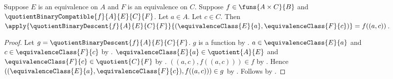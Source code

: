 \begin{proposition}\label{quotient_binary_descent_apply}
    Suppose $E$ is an equivalence on $A$ and
        $F$ is an equivalence on $C$.
    Suppose $f\in\funs{A\times C}{B}$ and
        $\quotientBinaryCompatible{f}{A}{E}{C}{F}$.
    Let $a\in A$.
    Let $c\in C$.
    Then
        $\apply{\quotientBinaryDescent{f}{A}{E}{C}{F}}
            {(\equivalenceClass{E}{a},\equivalenceClass{F}{c})}
        =f((a,c))$.
\end{proposition}
\begin{proof}
    Let $g=\quotientBinaryDescent{f}{A}{E}{C}{F}$.
    $g$ is a function by
        .
    $a\in\equivalenceClass{E}{a}$ and
        $c\in\equivalenceClass{F}{c}$ by
        .
    $\equivalenceClass{E}{a}\in\quotient{A}{E}$ and
        $\equivalenceClass{F}{c}\in\quotient{C}{F}$ by
        .
    $((a,c),f((a,c)))\in f$ by
        .
    Hence
        $((\equivalenceClass{E}{a},\equivalenceClass{F}{c}),f((a,c)))
            \in g$ by .
    Follows by .
\end{proof}

